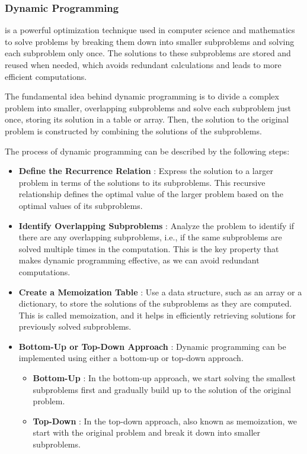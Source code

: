 \subsubsection{Dynamic Programming} is a powerful optimization technique used in computer science and mathematics to solve problems by breaking them down into smaller subproblems and solving each subproblem only once. The solutions to these subproblems are stored and reused when needed, which avoids redundant calculations and leads to more efficient computations.

The fundamental idea behind dynamic programming is to divide a complex problem into smaller, overlapping subproblems and solve each subproblem just once, storing its solution in a table or array. Then, the solution to the original problem is constructed by combining the solutions of the subproblems.

The process of dynamic programming can be described by the following steps:

\begin{itemize}
    \item \textbf{Define the Recurrence Relation} : Express the solution to a larger problem in terms of the solutions to its subproblems. This recursive relationship defines the optimal value of the larger problem based on the optimal values of its subproblems.
    \item \textbf{Identify Overlapping Subproblems} : Analyze the problem to identify if there are any overlapping subproblems, i.e., if the same subproblems are solved multiple times in the computation. This is the key property that makes dynamic programming effective, as we can avoid redundant computations.
    \item \textbf{Create a Memoization Table} : Use a data structure, such as an array or a dictionary, to store the solutions of the subproblems as they are computed. This is called memoization, and it helps in efficiently retrieving solutions for previously solved subproblems.
    \item \textbf{Bottom-Up or Top-Down Approach} : Dynamic programming can be implemented using either a bottom-up or top-down approach.
    \begin{itemize}
        \item \textbf{Bottom-Up} : In the bottom-up approach, we start solving the smallest subproblems first and gradually build up to the solution of the original problem.
        \item \textbf{Top-Down} : In the top-down approach, also known as memoization, we start with the original problem and break it down into smaller subproblems.
    \end{itemize}
\end{itemize}

